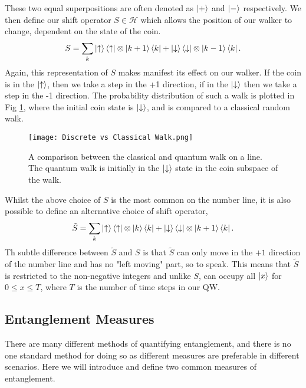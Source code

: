 These two equal superpositions are often denoted as $\ket{+}$ and $\ket{-}$ respectively.\newline
We then define our shift operator $S \in \mathcal{H}$ which allows the position of our walker to change, dependent on the state of the coin.
\begin{equation}
    S = \sum_k \ket{\uparrow}\bra{\uparrow} \otimes \ket{k + 1}\bra{k} + \ket{\downarrow}\bra{\downarrow} \otimes \ket{k - 1}\bra{k}.
\end{equation}
Again, this representation of $S$ makes manifest its effect on our walker. 
If the coin is in the $\ket{\uparrow}$, then we take a step in the +1 direction, if in the $\ket{\downarrow}$ then we take a step in the -1 direction. 
The probability distribution of such a walk is plotted in Fig \ref{fig:discVSclass}, where the initial coin state is $\ket{\downarrow}$, and is compared to a classical random walk.\newline

\begin{figure}
    \centering
    \texttt{[image: Discrete vs Classical Walk.png]}
    \caption{A comparison between the classical and quantum walk on a line. The quantum walk is initially in the $\ket{\downarrow}$ state in the coin subspace of the walk.}
    \label{fig:discVSclass}
\end{figure}

Whilst the above choice of $S$ is the most common on the number line, it is also possible to define an alternative choice of shift operator,
\begin{equation}
    \tilde{S} = \sum_k \ket{\uparrow}\bra{\uparrow} \otimes \ket{k}\bra{k} + \ket{\downarrow}\bra{\downarrow} \otimes \ket{k + 1}\bra{k}.
\end{equation}
Th subtle difference between $\tilde{S}$ and $S$ is that $\tilde{S}$ can only move in the $+1$ direction of the number line and has no "left moving" part, so to speak. 
This means that $\tilde{S}$ is restricted to the non-negative integers and unlike $S$, can occupy all $\ket{x}$ for $0\leq x\leq T$, where $T$ is the number of time steps in our QW.

\subsection{Entanglement Measures}
There are many different methods of quantifying entanglement, and there is no one standard method for doing so as different measures are preferable in different scenarios. 
Here we will introduce and define two common measures of entanglement.\newline

